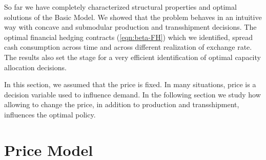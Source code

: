 \documentclass[mnsc,nonblindrev,copyedit]{informs2_wz} %
\newcommand{\V}{\cal{V}}
\begin{document}
%
%
%



So far we have completely characterized structural properties and optimal solutions of the Basic Model.  We showed that the problem behaves in an intuitive way with concave and submodular production and transshipment decisions.  The optimal financial hedging contracts (\ref{eqn:beta-FH}) which we identified, spread cash consumption across time and across different realization of exchange rate. The results also set the stage for a very efficient identification of optimal capacity allocation decisions.

In this section, we assumed that the price is fixed.  In many situations, price is a decision variable used to influence demand.  In the following section we study how allowing to change the price, in addition to production and transshipment, influences the optimal policy.





\section{Price Model \label{sect:priceModel}}
\end{document}
